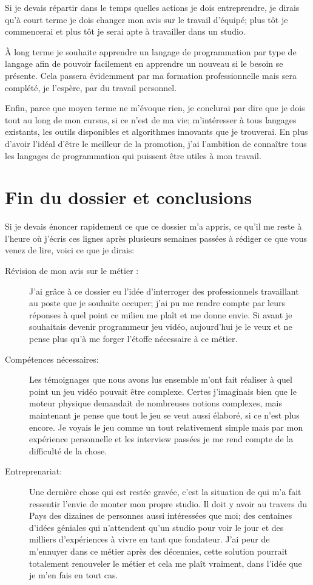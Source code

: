 \documentclass[12pt, a4paper]{report} %
\begin{document}
Si je devais répartir dans le temps quelles actions je dois entreprendre, je dirais qu'à court terme je dois changer mon avis sur le travail d'équipé; plus tôt je commencerai et plus tôt je serai apte à travailler dans un studio. 

\`{A} long terme je souhaite apprendre un langage de programmation par type de langage  afin de pouvoir facilement en apprendre un nouveau si le besoin se présente. Cela passera évidemment par ma formation professionnelle mais sera complété, je l'espère, par du travail personnel.

Enfin, parce que \og moyen terme \fg{} ne m'évoque rien, je conclurai par dire que je dois tout au long de mon cursus, si ce n'est de ma vie; m'intéresser à tous langages existants, les outils disponibles et algorithmes innovants que je trouverai. En plus d'avoir l'idéal d'être le meilleur de la promotion, j'ai l'ambition de connaître tous les langages de programmation qui puissent être utiles à mon travail.

\section{Fin du dossier et conclusions}
Si je devais énoncer rapidement ce que ce dossier m'a appris, ce qu'il me reste à l'heure où j'écris ces lignes après plusieurs semaines passées à rédiger ce que vous venez de lire, voici ce que je dirais:
\begin{description}
\item[Révision de mon avis sur le métier :] J'ai grâce à ce dossier eu l'idée d'interroger des professionnels travaillant au poste que je souhaite occuper; j'ai pu me rendre compte par leurs réponses à quel point ce milieu me plaît et me donne envie. Si avant je souhaitais devenir programmeur jeu vidéo, aujourd'hui je le veux et ne pense plus qu'à me forger l'étoffe nécessaire à ce métier.
\item[Compétences nécessaires:] Les témoignages que nous avons lus ensemble m'ont fait réaliser à quel point un jeu vidéo pouvait être complexe. Certes j'imaginais bien que le moteur physique demandait de nombreuses notions complexes, mais maintenant je pense que tout le jeu se veut aussi élaboré, si ce n'est plus encore. Je voyais le jeu comme un tout relativement simple mais par mon expérience personnelle et les interview passées je me rend compte de la difficulté de la chose.
\item[Entreprenariat:] Une dernière chose qui est restée gravée, c'est la situation de \agg{} qui m'a fait ressentir l'envie de monter mon propre studio. Il doit y avoir au travers du Pays des dizaines de personnes aussi intéressées que moi; des centaines d'idées géniales qui n'attendent qu'un studio pour voir le jour et des milliers d'expériences à vivre en tant que fondateur. J'ai peur de m'ennuyer dans ce métier après des décennies, cette solution pourrait totalement renouveler le métier et cela me plaît vraiment, dans l'idée que je m'en fais en tout cas.
\end{description}
\end{document}
